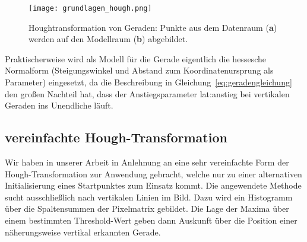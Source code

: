 \begin{figure}[H] %
  \centering
  \texttt{[image: grundlagen\_hough.png]}
  \caption{Houghtransformation von Geraden: Punkte aus dem Datenraum (\textbf{a}) werden auf den Modellraum (\textbf{b}) abgebildet.}
\end{figure} 

Praktischerweise wird als Modell für die Gerade eigentlich die hessesche Normalform (Steigungswinkel und Abstand zum Koordinatenursprung als Parameter) eingesetzt, da die Beschreibung in Gleichung~\ref{eq:geradengleichung} den großen Nachteil hat, dass der Anstiegsparameter \gls{lat:anstieg} bei vertikalen Geraden ins Unendliche läuft. 

\subsection{vereinfachte Hough-Transformation}
\label{ssec:grundlagen:hough:vereinfachte}
Wir haben in unserer Arbeit in Anlehnung an \autocite{alyRealTimeDetection2008} eine sehr vereinfachte Form der Hough-Transformation zur Anwendung gebracht, welche nur zu einer alternativen Initialisierung eines Startpunktes zum Einsatz kommt. Die angewendete Methode sucht ausschließlich nach vertikalen Linien im Bild. Dazu wird ein Histogramm über die Spaltensummen der Pixelmatrix gebildet. Die Lage der Maxima über einem bestimmten Threshold-Wert geben dann Auskunft über die Position einer näherungsweise vertikal erkannten Gerade.